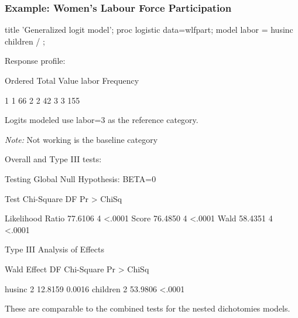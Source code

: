 \begin{frame}[fragile]
  \frametitle{Example: Women's Labour Force Participation}
\begin{Input}[label=\fbox{\texttt{wlfpart5.sas} $\cdots$}]
title 'Generalized logit model';
proc logistic data=wlfpart;
   model labor = husinc children / ;
\end{Input}
Response profile:
\begin{Output}[gobble=7]
                       Ordered                      Total
                         Value        labor     Frequency

                             1            1            66
                             2            2            42
                             3            3           155

             Logits modeled use labor=3 as the reference category.
\end{Output}
\emph{Note:} Not working is the baseline category
\end{frame}


\begin{frame}[fragile]
Overall and Type III tests:
\begin{Output}[gobble=7,baselinestretch=0.8]
                    Testing Global Null Hypothesis: BETA=0
 
            Test                 Chi-Square       DF     Pr > ChiSq

            Likelihood Ratio        77.6106        4         <.0001
            Score                   76.4850        4         <.0001
            Wald                    58.4351        4         <.0001

                          Type III Analysis of Effects
 
                                            Wald
                  Effect        DF    Chi-Square    Pr > ChiSq

                  husinc         2       12.8159        0.0016
                  children       2       53.9806        <.0001
\end{Output}
These are comparable to the combined tests for the nested dichotomies models.
\end{frame}

